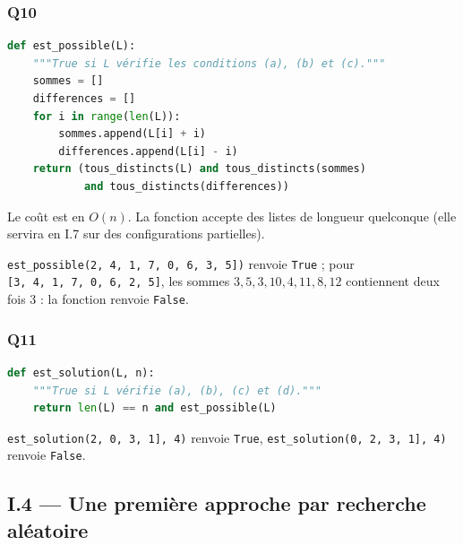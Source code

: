 \documentclass[11pt,a4paper]{article}
\begin{document}
\hypertarget{q10}{%
\subsubsection{Q10}\label{q10}}

\begin{lstlisting}[language=Python]
def est_possible(L):
    """True si L vérifie les conditions (a), (b) et (c)."""
    sommes = []
    differences = []
    for i in range(len(L)):
        sommes.append(L[i] + i)
        differences.append(L[i] - i)
    return (tous_distincts(L) and tous_distincts(sommes)
            and tous_distincts(differences))
\end{lstlisting}

Le coût est en \(O(n)\). La fonction accepte des listes de longueur quelconque (elle servira en I.7 sur des configurations partielles).

\texttt{est\_possible(\allowbreak{}{[}2,\allowbreak{}\ 4,\allowbreak{}\ 1,\allowbreak{}\ 7,\allowbreak{}\ 0,\allowbreak{}\ 6,\allowbreak{}\ 3,\allowbreak{}\ 5{]}\allowbreak{})\allowbreak{}} renvoie \texttt{True} ; pour \texttt{{[}3,\allowbreak{}\ 4,\allowbreak{}\ 1,\allowbreak{}\ 7,\allowbreak{}\ 0,\allowbreak{}\ 6,\allowbreak{}\ 2,\allowbreak{}\ 5{]}\allowbreak{}}, les sommes \(3, 5, 3, 10, 4, 11, 8, 12\) contiennent deux fois \(3\) : la fonction renvoie \texttt{False}.

\hypertarget{q11}{%
\subsubsection{Q11}\label{q11}}

\begin{lstlisting}[language=Python]
def est_solution(L, n):
    """True si L vérifie (a), (b), (c) et (d)."""
    return len(L) == n and est_possible(L)
\end{lstlisting}

\texttt{est\_solution(\allowbreak{}{[}2,\allowbreak{}\ 0,\allowbreak{}\ 3,\allowbreak{}\ 1{]}\allowbreak{},\allowbreak{}\ 4)\allowbreak{}} renvoie \texttt{True}, \texttt{est\_solution(\allowbreak{}{[}0,\allowbreak{}\ 2,\allowbreak{}\ 3,\allowbreak{}\ 1{]}\allowbreak{},\allowbreak{}\ 4)\allowbreak{}} renvoie \texttt{False}.

\hypertarget{i.4-une-premiuxe8re-approche-par-recherche-aluxe9atoire}{%
\subsection{I.4 --- Une première approche par recherche aléatoire}\label{i.4-une-premiuxe8re-approche-par-recherche-aluxe9atoire}}
\end{document}
